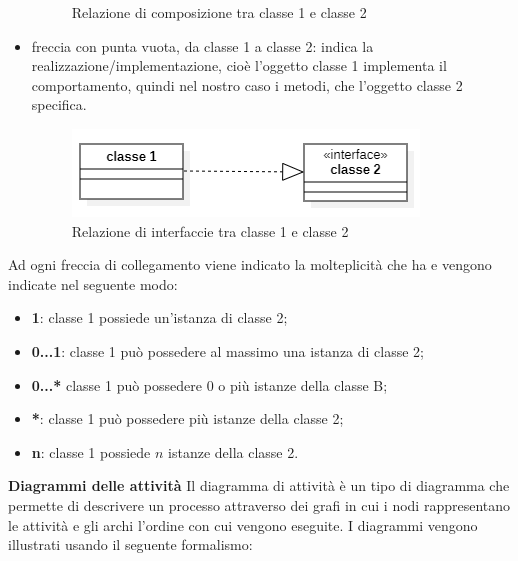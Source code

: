 \begin{itemize}
\begin{figure}[H]
		\caption{Relazione di composizione tra classe 1 e classe 2}
	\end{figure}
	\item freccia con punta vuota, da classe 1 a classe 2: indica la realizzazione/implementazione, cioè l'oggetto classe 1 implementa il comportamento, quindi nel nostro caso i metodi, che l'oggetto classe 2 specifica. 
	\begin{figure}[H]
		\centering\includegraphics{../immagini/normeUML/frecInter.png}
		\caption{Relazione di interfaccie tra classe 1 e classe 2}
	\end{figure}
\end{itemize}
Ad ogni freccia di collegamento viene indicato la molteplicità che ha e vengono indicate nel seguente modo:
\begin{itemize}
	\item \textbf{1}: classe 1 possiede un'istanza di classe 2;
	\item \textbf{0...1}: classe 1 può possedere al massimo una istanza di classe 2;
	\item \textbf{0...*} classe 1 può possedere 0 o più istanze della classe B;
	\item \textbf{*}: classe 1 può possedere più istanze della classe 2;
	\item \textbf{n}: classe 1 possiede $n$ istanze della classe 2.
\end{itemize}
\quad\large\textbf{Diagrammi delle attività}
Il diagramma di attività è un tipo di diagramma che permette di descrivere un processo attraverso dei grafi in cui i nodi rappresentano le attività e gli archi l'ordine con cui vengono eseguite. I diagrammi vengono illustrati usando il seguente formalismo:
